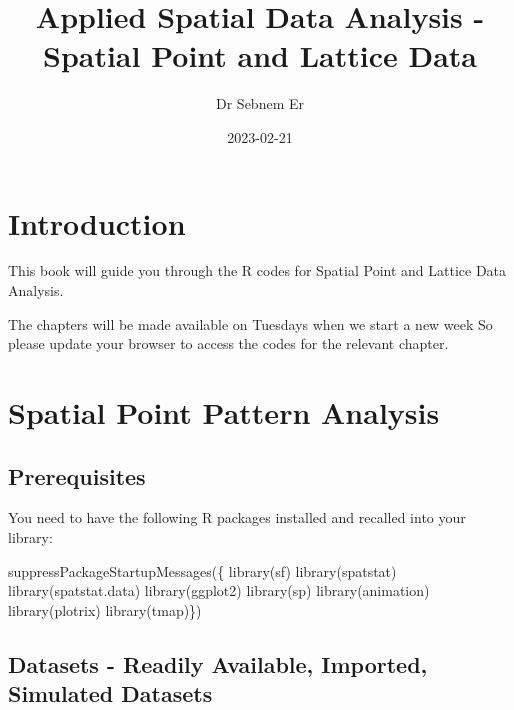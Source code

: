 \documentclass[
]{book}
\title{Applied Spatial Data Analysis - Spatial Point and Lattice Data}
\author{Dr Sebnem Er}
\date{2023-02-21}
\newenvironment{Shaded}{\begin{snugshade}}{\end{snugshade}}
\newcommand{\FunctionTok}[1]{\textcolor[rgb]{0.00,0.00,0.00}{#1}}
\newcommand{\NormalTok}[1]{#1}
\begin{document}
\maketitle

{
\setcounter{tocdepth}{1}
\tableofcontents
}
\hypertarget{introduction}{%
\chapter{Introduction}\label{introduction}}

This book will guide you through the R codes for Spatial Point and Lattice Data Analysis.

The chapters will be made available on Tuesdays when we start a new week So please update your browser to access the codes for the relevant chapter.

\hypertarget{spatial-point-pattern-analysis}{%
\chapter{Spatial Point Pattern Analysis}\label{spatial-point-pattern-analysis}}

\hypertarget{prerequisites}{%
\section{Prerequisites}\label{prerequisites}}

You need to have the following R packages installed and recalled into your library:

\begin{Shaded}
\begin{Highlighting}[]
\FunctionTok{suppressPackageStartupMessages}\NormalTok{(\{}
\FunctionTok{library}\NormalTok{(sf)}
\FunctionTok{library}\NormalTok{(spatstat)}
\FunctionTok{library}\NormalTok{(spatstat.data)}
\FunctionTok{library}\NormalTok{(ggplot2)}
\FunctionTok{library}\NormalTok{(sp)}
\FunctionTok{library}\NormalTok{(animation)}
\FunctionTok{library}\NormalTok{(plotrix)}
\FunctionTok{library}\NormalTok{(tmap)\})}
\end{Highlighting}
\end{Shaded}

\hypertarget{datasets---readily-available-imported-simulated-datasets}{%
\section{Datasets - Readily Available, Imported, Simulated Datasets}\label{datasets---readily-available-imported-simulated-datasets}}
\end{document}
